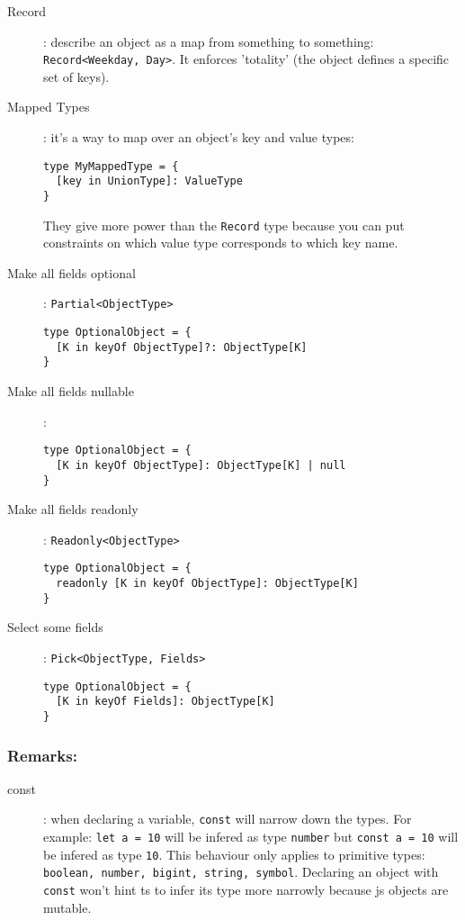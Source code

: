 \documentclass[french]{article}
\begin{document}
\begin{description}
  \item[Record]: describe an object as a map from something to something: \\ \lstinline{Record<Weekday, Day>}. It enforces 'totality' (the object defines a specific set of keys).
  \item[Mapped Types]: it's a way to map over an object's key and value types:
    \begin{lstlisting}
type MyMappedType = {
  [key in UnionType]: ValueType
}
    \end{lstlisting}
    They give more power than the \lstinline{Record} type because you can put constraints on which value type corresponds to which key name.
\end{description}

\begin{description}
  \item[Make all fields optional]: \lstinline{Partial<ObjectType>}
    \begin{lstlisting}
type OptionalObject = {
  [K in keyOf ObjectType]?: ObjectType[K]
}
    \end{lstlisting}
  \item[Make all fields nullable]:
    \begin{lstlisting}
type OptionalObject = {
  [K in keyOf ObjectType]: ObjectType[K] | null
}
    \end{lstlisting}
  \item[Make all fields readonly]: \lstinline{Readonly<ObjectType>}
    \begin{lstlisting}
type OptionalObject = {
  readonly [K in keyOf ObjectType]: ObjectType[K]
}
    \end{lstlisting}
  \item[Select some fields]: \lstinline{Pick<ObjectType, Fields>}
    \begin{lstlisting}
type OptionalObject = {
  [K in keyOf Fields]: ObjectType[K]
}
    \end{lstlisting}
\end{description}


\subsubsection*{Remarks:}

\begin{description}
  \item[const]: when declaring a variable, \lstinline{const} will narrow down the types. For example: \lstinline{let a = 10} will be infered as type \lstinline{number} but \lstinline{const a = 10} will be infered as type \lstinline{10}. This behaviour only applies to primitive types: \\ \lstinline{boolean, number, bigint, string, symbol}. Declaring an object with \lstinline{const} won't hint ts to infer its type more narrowly because js objects are mutable.
\end{description}
\end{document}
